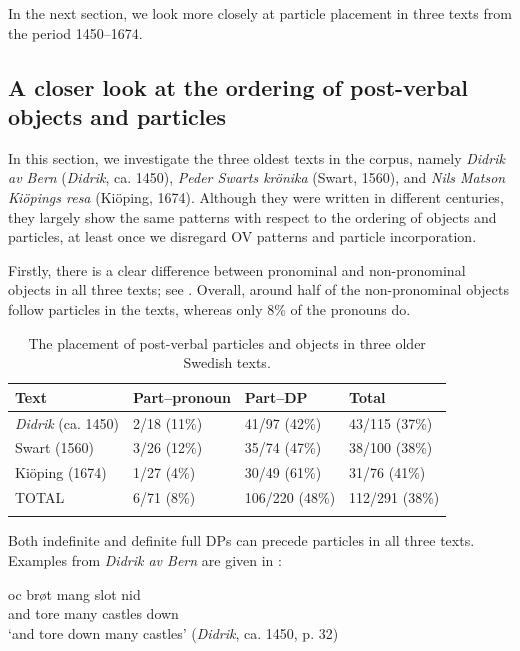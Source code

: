 \documentclass[output=paper]{langscibook}
\begin{document}
In the next section, we look more closely at particle placement in three texts from the period 1450–1674.


\subsection{A closer look at the ordering of post-verbal objects and particles}\label{sec:lalu:4.2}

In this section, we investigate the three oldest texts in the corpus, namely \textit{Didrik av Bern} (\textit{Didrik}, ca. 1450), \textit{Peder Swarts krönika} (Swart, 1560), and \textit{Nils Matson Kiöpings resa} (Kiöping, 1674). Although they were written in different centuries, they largely show the same patterns with respect to the ordering of objects and particles, at least once we disregard OV patterns and particle incorporation. 



Firstly, there is a clear difference between pronominal and non-pronominal objects in all three texts; see . Overall, around half of the non-pronominal objects follow particles in the texts, whereas only 8\% of the pronouns do.


\begin{table}
\caption{The placement of post-verbal particles and objects in three older Swedish texts.}
\label{tab:lalu:1}
\begin{tabularx}{.9\textwidth}{lXXX}
\lsptoprule
Text & Part--pronoun & Part–DP & Total\\
\midrule
\textit{Didrik} (ca. 1450) & 2/18 (11\%) & 41/97 (42\%) & 43/115 (37\%)\\
Swart (1560) & 3/26 (12\%) & 35/74 (47\%) & 38/100 (38\%)\\
Kiöping (1674) & 1/27 (4\%) & 30/49 (61\%) & 31/76 (41\%)\\
\midrule
TOTAL & 6/71 (8\%) & 106/220 (48\%) & 112/291 (38\%)\\
\lspbottomrule
\end{tabularx}
\end{table}

Both indefinite and definite full DPs can precede particles in all three texts. Examples from \textit{Didrik av Bern} are given in :


\ea\label{ex:lalu:23}
\ea
\gll  oc     brøt   mang   slot       nid\\
    and     tore   many   castles   down \\
\glt `and tore down many castles’ (\textit{Didrik}, ca. 1450, p. 32)\\
\end{document}
